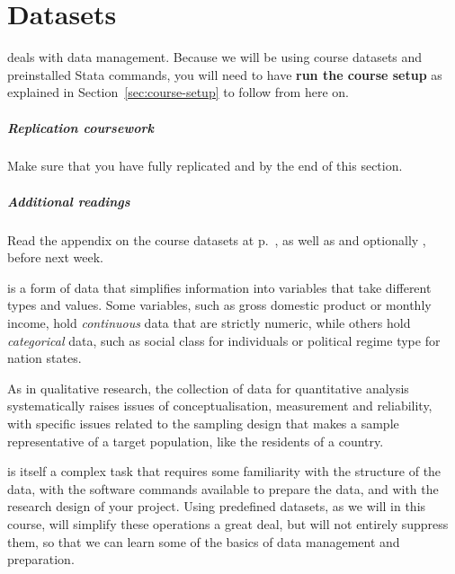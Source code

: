 %
%
\chapter{Datasets}%
	\label{ch:data}%
  \begin{mybox}
     deals with data management. Because we will be using course datasets and preinstalled Stata commands, you will need to have \textbf{run the course setup} as explained in Section~\ref{sec:course-setup} to follow from here on.%

    \paragraph{Replication coursework} %
    Make sure that you have fully replicated  and  by the end of this section.%

    \paragraph{Additional readings} %
    Read the appendix on the course datasets at p.~\pageref{ch:data-sources}, as well as \citeauthor[ch.~2--3]{Urdan:2010a} and optionally \citeauthor[ch.~2.1--2.4]{FeinsteinThomas:2002d}, before next week.%
    
  \end{mybox}
  \startcontents[chapters]%
	\newpage
	


 is a form of data that simplifies information into variables that take different types and values. Some variables, such as gross domestic product or monthly income, hold \emph{continuous} data that are strictly numeric, while others hold \emph{categorical} data, such as social class for individuals or political regime type for nation states.%

As in qualitative research, the collection of data for quantitative analysis systematically raises issues of conceptualisation, measurement and reliability, with specific issues related to the sampling design that makes a sample representative of a target population, like the residents of a country.

 is itself a complex task that requires some familiarity with the structure of the data, with the software commands available to prepare the data, and with the research design of your project. Using predefined datasets, as we will in this course, will simplify these operations a great deal, but will not entirely suppress them, so that we can learn some of the basics of data management and preparation.

